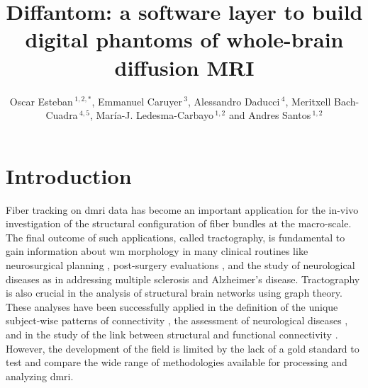\documentclass[english]{frontiers/frontiersSCNS} %
\def\firstAuthorLast{Esteban {et~al.}} %
\def\Authors{Oscar Esteban\,$^{1,2,*}$, Emmanuel Caruyer\,$^{3}$, Alessandro Daducci\,$^{4}$, Meritxell Bach-Cuadra\,$^{4,5}$,%
Mar\'ia-J. Ledesma-Carbayo\,$^{1,2}$ and Andres Santos\,$^{1,2}$}
\begin{document}
\onecolumn
{}

\title[Diffantom]{Diffantom: a software layer to build digital phantoms of whole-brain diffusion MRI}

\author[\firstAuthorLast ]{\Authors} %
\address{} %
\correspondance{} %

\extraAuth{}%


\maketitle

\linenumbers

\section*{Introduction}
Fiber tracking on \gls*{dmri} data has become an important application for the in-vivo investigation
  of the structural configuration of fiber bundles at the macro-scale.
The final outcome of such applications, called tractography, is fundamental to gain information about
  \gls*{wm} morphology in many clinical routines like neurosurgical planning \citep{golby_interactive_2011},
  post-surgery evaluations \citep{toda_utility_2014},
  and the study of neurological diseases as in \citep{chua_diffusion_2008} addressing multiple sclerosis and
  Alzheimer's disease.
Tractography is also crucial in the analysis of structural brain networks using graph theory.
These analyses have been successfully applied in the definition of the unique subject-wise patterns of connectivity
  \citep{sporns_human_2005}, the assessment of neurological diseases \citep{griffa_structural_2013}, and in the
  study of the link between structural and functional connectivity \citep{messe_predicting_2015}.
However, the development of the field is limited by the lack of a gold standard to test and compare the
  wide range of methodologies available for processing and analyzing \gls*{dmri}.
\end{document}
